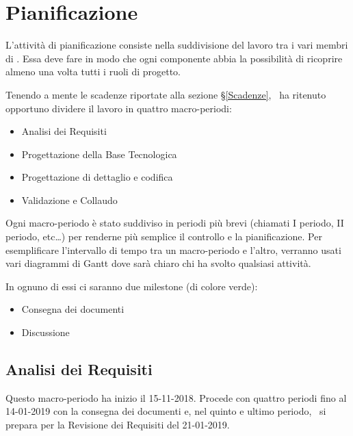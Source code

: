 \newpage
\section{Pianificazione}\label{Pianificazione}
	L'attività di pianificazione consiste nella suddivisione del lavoro tra i vari membri di \gruppo.
	Essa deve fare in modo che ogni componente abbia la possibilità di ricoprire almeno una volta tutti i ruoli di progetto.
    
    Tenendo a mente le scadenze riportate alla sezione \S\ref{Scadenze}, \gruppo\ ha ritenuto opportuno dividere il lavoro in quattro macro-periodi:
	\begin{itemize}
	\item Analisi dei Requisiti
	\item Progettazione della Base Tecnologica
	\item Progettazione di dettaglio e codifica
	\item Validazione e Collaudo
	\end{itemize}

	Ogni macro-periodo è stato suddiviso in periodi più brevi (chiamati I periodo, II periodo, etc\dots) per renderne più semplice il
    controllo e la pianificazione. Per esemplificare l'intervallo di tempo tra un macro-periodo e l'altro, verranno usati vari
    diagrammi di Gantt dove sarà chiaro chi ha svolto qualsiasi attività.

    In ognuno di essi ci saranno due milestone (di colore verde):

    \begin{itemize}
    	\item Consegna dei documenti
    	\item Discussione
    \end{itemize}

    \subsection{Analisi dei Requisiti}
        Questo macro-periodo ha inizio il 15-11-2018. Procede con quattro periodi fino al 14-01-2019 con la consegna dei documenti e, nel
        quinto e ultimo periodo, \gruppo\ si prepara per la Revisione dei Requisiti del 21-01-2019.
        
